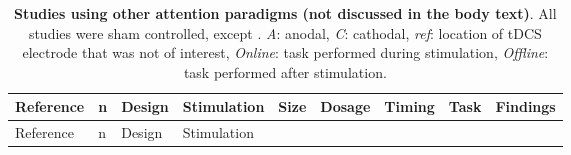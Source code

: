 \documentclass[11pt,english,]{memoir}
\begin{document}
\begin{longtable}[]{@{}lllllllll@{}}
\caption{\label{tab:other} \textbf{Studies using other attention paradigms (not discussed in the body text)}. All studies were sham controlled, except \textcite{London2015}. \emph{A}: anodal, \emph{C}: cathodal, \emph{ref}: location of tDCS electrode that was not of interest, \emph{Online}: task performed during stimulation, \emph{Offline}: task performed after stimulation.}\tabularnewline
\toprule
\begin{minipage}[b]{0.08\columnwidth}\raggedright
Reference\strut
\end{minipage} & \begin{minipage}[b]{0.03\columnwidth}\raggedright
n\strut
\end{minipage} & \begin{minipage}[b]{0.05\columnwidth}\raggedright
Design\strut
\end{minipage} & \begin{minipage}[b]{0.12\columnwidth}\raggedright
Stimulation\strut
\end{minipage} & \begin{minipage}[b]{0.04\columnwidth}\raggedright
Size\strut
\end{minipage} & \begin{minipage}[b]{0.05\columnwidth}\raggedright
Dosage\strut
\end{minipage} & \begin{minipage}[b]{0.05\columnwidth}\raggedright
Timing\strut
\end{minipage} & \begin{minipage}[b]{0.08\columnwidth}\raggedright
Task\strut
\end{minipage} & \begin{minipage}[b]{0.27\columnwidth}\raggedright
Findings\strut
\end{minipage}\tabularnewline
\midrule
\endfirsthead
\toprule
\begin{minipage}[b]{0.08\columnwidth}\raggedright
Reference\strut
\end{minipage} & \begin{minipage}[b]{0.03\columnwidth}\raggedright
n\strut
\end{minipage} & \begin{minipage}[b]{0.05\columnwidth}\raggedright
Design\strut
\end{minipage} & \begin{minipage}[b]{0.12\columnwidth}\raggedright
Stimulation\strut
\end{minipage} & \begin{minipage}[b]{0.04\columnwidth}\raggedright

\end{minipage}
\end{longtable}
\end{document}
